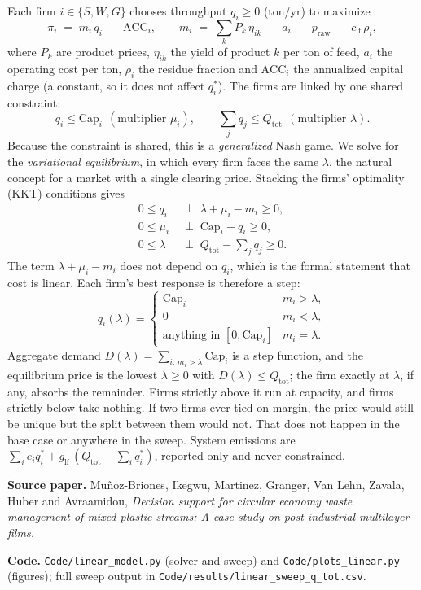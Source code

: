 \documentclass[11pt]{article}
\begin{document}
Each firm $i\in\{S,W,G\}$ chooses throughput $q_i\ge 0$ (ton/yr) to maximize
\[
\pi_i \;=\; m_i\,q_i \;-\; \mathrm{ACC}_i,
\qquad
m_i \;=\; \sum_k P_k\,\eta_{ik} \;-\; a_i \;-\; p_{\mathrm{raw}} \;-\; c_{\mathrm{lf}}\,\rho_i ,
\]
where $P_k$ are product prices, $\eta_{ik}$ the yield of product $k$ per ton of
feed, $a_i$ the operating cost per ton, $\rho_i$ the residue fraction and
$\mathrm{ACC}_i$ the annualized capital charge (a constant, so it does not affect
$q_i^\ast$). The firms are linked by one shared constraint:
\[
q_i \le \mathrm{Cap}_i \ \ (\text{multiplier } \mu_i),
\qquad
\sum_{j} q_j \le Q_{\mathrm{tot}} \ \ (\text{multiplier } \lambda).
\]
Because the constraint is shared, this is a \emph{generalized} Nash game. We solve for the
\emph{variational equilibrium}, in which every firm faces the same $\lambda$,
the natural concept for a market with a single clearing price. Stacking the
firms' optimality (KKT) conditions gives
\begin{align*}
0 \le q_i &\;\perp\; \lambda+\mu_i-m_i \ge 0, \\
0 \le \mu_i &\;\perp\; \mathrm{Cap}_i-q_i \ge 0, \\
0 \le \lambda &\;\perp\; Q_{\mathrm{tot}}-\textstyle\sum_j q_j \ge 0 .
\end{align*}
The term $\lambda+\mu_i-m_i$ does not depend on $q_i$, which is the formal
statement that cost is linear. Each firm's best response is therefore a step:
\[
q_i(\lambda)=
\begin{cases}
\mathrm{Cap}_i & m_i>\lambda,\\
0 & m_i<\lambda,\\
\text{anything in }[0,\mathrm{Cap}_i] & m_i=\lambda .
\end{cases}
\]
Aggregate demand $D(\lambda)=\sum_{i:\,m_i>\lambda}\mathrm{Cap}_i$ is a step function, and the
equilibrium price is the lowest $\lambda\ge 0$ with $D(\lambda)\le Q_{\mathrm{tot}}$;
the firm exactly at $\lambda$, if any, absorbs the remainder. Firms strictly above
it run at capacity, and firms strictly below take nothing. If two firms ever tied
on margin, the price would still be unique but the split between them would not.
That does not happen in the base case or anywhere in the sweep.
System emissions are $\sum_i e_i q_i^\ast + g_{\mathrm{lf}}\,(Q_{\mathrm{tot}}-\sum_i q_i^\ast)$,
reported only and never constrained.

\medskip
\noindent\textbf{Source paper.} Mu\~{n}oz-Briones, Ikegwu, Martinez, Granger, Van Lehn,
Zavala, Huber and Avraamidou, \emph{Decision support for circular economy waste
management of mixed plastic streams: A case study on post-industrial multilayer
films.}

\noindent\textbf{Code.} \texttt{Code/linear\_model.py} (solver and sweep) and
\texttt{Code/plots\_linear.py} (figures); full sweep output in
\texttt{Code/results/linear\_sweep\_q\_tot.csv}.
\end{document}
